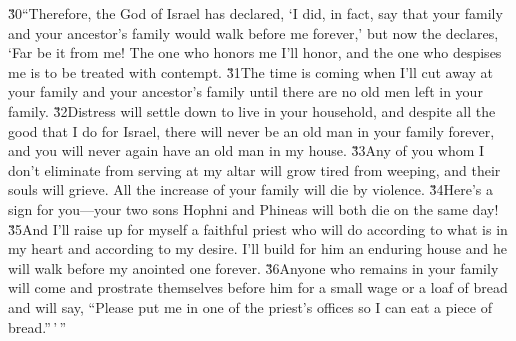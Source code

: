 \v{30}``Therefore, the  God of Israel has declared, `I did, in fact, say that your family and your ancestor's family would walk before me forever,' but now the  declares, `Far be it from me! The one who honors me I'll honor, and the one who despises me is to be treated with contempt. \v{31}The time is coming when I'll cut away at your family and your ancestor's family until there are no old men left in your family. \v{32}Distress will settle down to live in your household, and despite all the good that I do for Israel, there will never be an old man in your family forever, and you will never again have an old man in my house. \v{33}Any of you whom I don't eliminate from serving at my altar will grow tired from weeping, and their souls will grieve. All the increase of your family will die by violence. \v{34}Here's a sign for you---your two sons Hophni and Phineas will both die on the same day! \v{35}And I'll raise up for myself a faithful priest who will do according to what is in my heart and according to my desire. I'll build for him an enduring house and he will walk before my anointed one forever. \v{36}Anyone who remains in your family will come and prostrate themselves before him for a small wage or a loaf of bread and will say, ``Please put me in one of the priest's offices so I can eat a piece of bread.''\,'\,''

